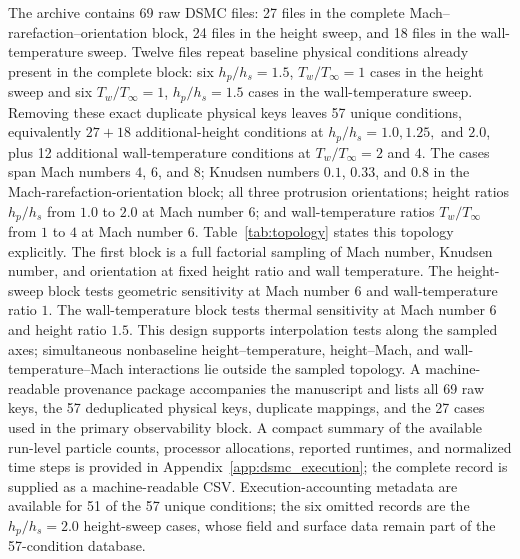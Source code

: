 \documentclass[aip,pof,preprint,floatfix,amsmath,amssymb]{revtex4-2}
\begin{document}
The archive contains 69 raw DSMC files: 27 files in the complete Mach--rarefaction--orientation block, 24 files in the height sweep, and 18 files in the wall-temperature sweep. Twelve files repeat baseline physical conditions already present in the complete block: six $h_p/h_s=1.5$, $T_w/T_\infty=1$ cases in the height sweep and six $T_w/T_\infty=1$, $h_p/h_s=1.5$ cases in the wall-temperature sweep. Removing these exact duplicate physical keys leaves 57 unique conditions, equivalently $27+18$ additional-height conditions at $h_p/h_s=1.0,1.25,$ and $2.0$, plus 12 additional wall-temperature conditions at $T_w/T_\infty=2$ and $4$. The cases span Mach numbers $4$, $6$, and $8$; Knudsen numbers $0.1$, $0.33$, and $0.8$ in the Mach-rarefaction-orientation block; all three protrusion orientations; height ratios $h_p/h_s$ from $1.0$ to $2.0$ at Mach number $6$; and wall-temperature ratios $T_w/T_\infty$ from $1$ to $4$ at Mach number $6$. Table~\ref{tab:topology} states this topology explicitly. The first block is a full factorial sampling of Mach number, Knudsen number, and orientation at fixed height ratio and wall temperature. The height-sweep block tests geometric sensitivity at Mach number $6$ and wall-temperature ratio $1$. The wall-temperature block tests thermal sensitivity at Mach number $6$ and height ratio $1.5$. This design supports interpolation tests along the sampled axes; simultaneous nonbaseline height--temperature, height--Mach, and wall-temperature--Mach interactions lie outside the sampled topology. A machine-readable provenance package accompanies the manuscript and lists all 69 raw keys, the 57 deduplicated physical keys, duplicate mappings, and the 27 cases used in the primary observability block. A compact summary of the available run-level particle counts, processor allocations, reported runtimes, and normalized time steps is provided in Appendix~\ref{app:dsmc_execution}; the complete record is supplied as a machine-readable CSV. Execution-accounting metadata are available for 51 of the 57 unique conditions; the six omitted records are the $h_p/h_s=2.0$ height-sweep cases, whose field and surface data remain part of the 57-condition database.
\end{document}
